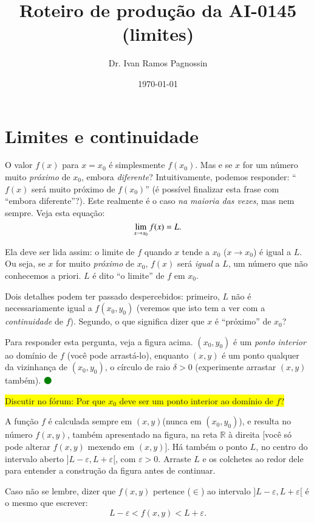 \documentclass[fleqn,12pt]{article}
\title{Roteiro de produção da AI-0145 (limites)}
\author{Dr. Ivan Ramos Pagnossin}
\date{\today}
\newcommand\proceed{\textcolor{green}{$\medbullet$}\xspace}
\newcommand\pt{\ensuremath{(x,y)}\xspace}
\newcommand\ptzero{\ensuremath{(x_0,y_0)}\xspace}
\newcommand\forum[1]{\colorbox{yellow}{Discutir no fórum: #1}}
\begin{document}
    \maketitle
    


    \section{Limites e continuidade}

    O valor $f(x)$ para $x = x_0$ é simplesmente $f(x_0)$. Mas e se $x$ for um número muito \emph{próximo} de $x_0$, embora \emph{diferente}? Intuitivamente, podemos responder: ``$f(x)$ será muito próximo de $f(x_0)$'' (é possível finalizar esta frase com ``embora diferente''?). Este realmente é o caso \emph{na maioria das vezes}, mas nem sempre. Veja esta equação:
    \begin{equation*}
	\lim_{\scriptsize x  \to x_0} f(x) = L.
    \end{equation*}

    Ela deve ser lida assim: o limite de $f$ quando $x$ tende a $x_0$ ($x \to x_0$) é igual a $L$. Ou seja, se $x$ for muito \emph{próximo} de $x_0$, $f(x)$ será \emph{igual} a $L$, um número que não conhecemos a priori. $L$ é dito ``o limite'' de $f$ em $x_0$.

    Dois detalhes podem ter passado despercebidos: primeiro, $L$ não é necessariamente igual a $f(x_0,y_0)$ (veremos que isto tem a ver com a \emph{continuidade} de $f$). Segundo, o que significa dizer que $x$ é ``próximo'' de $x_0$?

    Para responder esta pergunta, veja a figura acima. \ptzero é um \emph{ponto interior} ao domínio de $f$ (você pode arrastá-lo), enquanto \pt é um ponto qualquer da vizinhança de \ptzero, o círculo de raio $\delta > 0$ (experimente arrastar \pt também). \proceed

    \forum{Por que $x_0$ deve ser um ponto interior ao domínio de $f$?}

    A função $f$ é calculada sempre em \pt (nunca em \ptzero), e resulta no número $f(x,y)$, também apresentado na figura, na reta $\mathbb{R}$ à direita [você só pode alterar $f(x,y)$ mexendo em \pt]. Há também o ponto $L$, no centro do intervalo aberto $]L - \varepsilon, L + \varepsilon[$, com $\varepsilon > 0$. Arraste $L$ e os colchetes ao redor dele para entender a construção da figura antes de continuar. 

    Caso não se lembre, dizer que $f(x,y)$ pertence ($\in$) ao intervalo $]L - \varepsilon, L + \varepsilon[$ é o mesmo que escrever:
    \begin{equation*}
	L - \varepsilon < f(x,y) < L + \varepsilon.
    \end{equation*}
\end{document}
